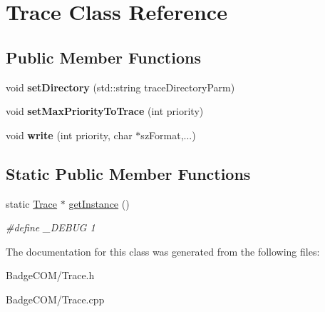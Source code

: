 \hypertarget{class_trace}{\section{Trace Class Reference}
\label{class_trace}
}
\subsection*{Public Member Functions}
\begin{DoxyCompactItemize}
\item 
\hypertarget{class_trace_ada9d6bd09d5c2da1cafeb6cfe63224a7}{void {\bfseries set\-Directory} (std\-::string trace\-Directory\-Parm)}\label{class_trace_ada9d6bd09d5c2da1cafeb6cfe63224a7}

\item 
\hypertarget{class_trace_a1cf65d1086a851cfc62f4691dc7a07d7}{void {\bfseries set\-Max\-Priority\-To\-Trace} (int priority)}\label{class_trace_a1cf65d1086a851cfc62f4691dc7a07d7}

\item 
\hypertarget{class_trace_ab7e1eefe092f8db224f59d01cab1ad6d}{void {\bfseries write} (int priority, char $\ast$sz\-Format,...)}\label{class_trace_ab7e1eefe092f8db224f59d01cab1ad6d}

\end{DoxyCompactItemize}
\subsection*{Static Public Member Functions}
\begin{DoxyCompactItemize}
\item 
\hypertarget{class_trace_a02ad2c1706cc3e6dc71c959a5ae5ad26}{static \hyperlink{class_trace}{Trace} $\ast$ \hyperlink{class_trace_a02ad2c1706cc3e6dc71c959a5ae5ad26}{get\-Instance} ()}\label{class_trace_a02ad2c1706cc3e6dc71c959a5ae5ad26}

\begin{DoxyCompactList}\small\item\em \#define \-\_\-\-D\-E\-B\-U\-G 1 \end{DoxyCompactList}\end{DoxyCompactItemize}


The documentation for this class was generated from the following files\-:\begin{DoxyCompactItemize}
\item 
Badge\-C\-O\-M/Trace.\-h\item 
Badge\-C\-O\-M/Trace.\-cpp\end{DoxyCompactItemize}
